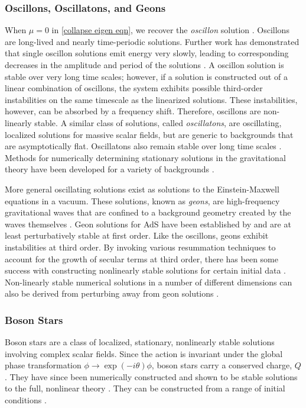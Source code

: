 \documentclass[../PhD.tex]{subfiles}
\begin{document}
\subsubsection{Oscillons, Oscillatons, and Geons}
\label{sub: geons}

When $\mu = 0$ in \eqref{collapse eigen eqn}, we recover the \emph{oscillon} solution \cite{1701.09100}. Oscillons are long-lived and nearly time-periodic solutions. Further work has demonstrated that single oscillon solutions emit energy very slowly, leading to corresponding decreases in the amplitude and period of the solutions \cite{hep-ph/9503217}. A oscillon solution is stable over very long time scales; however, if a solution is constructed out of a linear combination of oscillons, the system exhibits possible third-order instabilities on the same timescale as the linearized solutions. These instabilities, however, can be absorbed by a frequency shift. Therefore, oscillons are non-linearly stable. A similar class of solutions, called \emph{oscillatons}, are oscillating, localized solutions for massive scalar fields, but are generic to backgrounds that are asymptotically flat. Oscillatons also remain stable over long time scales \cite{gr-qc/0310006}. Methods for numerically determining stationary solutions in the gravitational theory have been developed for a variety of backgrounds \cite{1510.02804}.

More general oscillating solutions exist as solutions to the Einstein-Maxwell equations in a vacuum. These solutions, known as \emph{geons}, are high-frequency gravitational waves that are confined to a background geometry created by the waves themselves \cite{Wheeler:1955zz}. Geon solutions for AdS have been established by \cite{1109.1825} and are at least perturbatively stable at first order. Like the oscillons, geons exhibit instabilities at third order. By invoking various resummation techniques to account for the growth of secular terms at third order, there has been some success with constructing nonlinearly stable solutions for certain initial data \cite{1408.5906, 1701.07804}. Non-linearly stable numerical solutions in a number of different dimensions can also be derived from perturbing away from geon solutions \cite{1503.07746}. 

\subsubsection{Boson Stars}

Boson stars are a class of localized, stationary, nonlinearly stable solutions involving complex scalar fields. Since the \ads action is invariant under the global phase transformation $\phi \to \exp(-i \theta) \phi$, boson stars carry a conserved charge, $Q$. They have since been numerically constructed and shown to be stable solutions to the full, nonlinear theory \cite{1304.4166}. They can be constructed from a range of initial conditions \cite{1209.2378, 1301.2452}. 
\end{document}
